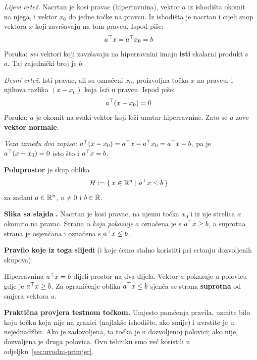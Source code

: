 \emph{Lijevi crtež.} Nacrtan je kosi pravac (hiperravnina), vektor $a$ iz
ishodišta okomit na njega, i vektor $x_0$ do jedne točke na pravcu. Iz
ishodišta je nacrtan i cijeli snop vektora $x$ koji završavaju na tom pravcu.
Ispod piše:
\[
a^{\top} x = a^{\top} x_0 = b
\]
Poruka: \emph{svi} vektori koji završavaju na hiperravnini imaju \textbf{isti}
skalarni produkt s $a$. Taj zajednički broj je $b$.

\emph{Desni crtež.} Isti pravac, ali su označeni $x_0$, proizvoljna točka $x$ na
pravcu, i njihova razlika $(x - x_0)$ koja \emph{leži} u pravcu. Ispod piše:
\[
a^{\top}(x - x_0) = 0
\]
Poruka: $a$ je okomit na svaki vektor koji leži unutar hiperravnine. Zato se $a$
zove \textbf{vektor normale}.

\emph{Veza između dva zapisa:} $a^{\top}(x - x_0) = a^{\top} x - a^{\top} x_0 = a^{\top} x - b$, pa
je $a^{\top}(x-x_0) = 0$ isto što i $a^{\top} x = b$. \checkmark

\begin{definicija}[Poluprostor]
\textbf{Poluprostor} je skup oblika
\[
H := \{\, x \in \mathbb{R}^n \mid a^{\top} x \le b \,\}
\]
za zadani $a \in \mathbb{R}^n$, $a \ne 0$ i $b \in \mathbb{R}$.
\end{definicija}

\textbf{Slika sa slajda} \textbf{.} Nacrtan je kosi pravac, na njemu
točka $x_0$ i iz nje strelica $a$ okomito na pravac. Strana \emph{u koju
pokazuje} $a$ označena je s $a^{\top} x \ge b$, a suprotna strana je osjenčana i
označena s $a^{\top} x \le b$.

\textbf{Pravilo koje iz toga slijedi} (i koje ćemo stalno koristiti pri
crtanju dozvoljenih skupova):

\begin{teorem}
Hiperravnina $a^{\top} x = b$ dijeli prostor na dva dijela. Vektor $a$ pokazuje u
polovicu gdje je $a^{\top} x \ge b$. Za ograničenje oblika $a^{\top} x \le b$ sjenča se
strana \textbf{suprotna} od smjera vektora $a$.
\end{teorem}

\textbf{Praktična provjera testnom točkom.} Umjesto pamćenja pravila, uzmite
bilo koju točku koja nije na granici (najlakše ishodište, ako smije) i uvrstite
je u nejednadžbu. Ako je zadovoljena, ta točka je u dozvoljenoj polovici; ako
nije, dozvoljena je druga polovica. Ovu tehniku smo već koristili u
odjeljku~\ref{sec:uvodni-primjer}.

